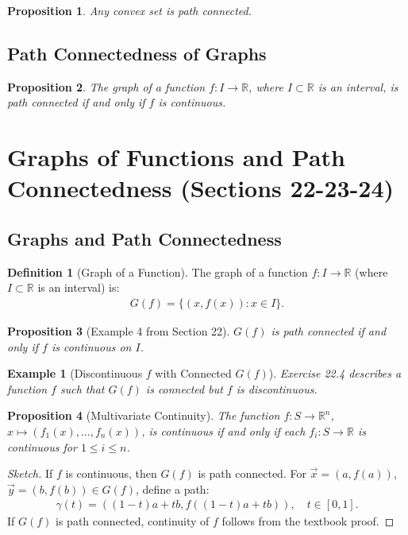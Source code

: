 \documentclass[9pt]{article}
\theoremstyle{definition}
\newtheorem{definition}{Definition}
\theoremstyle{plain}
\newtheorem{proposition}{Proposition}
\newtheorem{example}{Example}
\begin{document}
\begin{proposition}
Any convex set is path connected.
\end{proposition}

\subsection*{Path Connectedness of Graphs}
\begin{proposition}
The graph of a function $ f : I \to \mathbb{R} $, where $ I \subset \mathbb{R} $ is an interval, is path connected if and only if $ f $ is continuous.
\end{proposition}
\section*{Graphs of Functions and Path Connectedness (Sections 22-23-24)}

\subsection*{Graphs and Path Connectedness}
\begin{definition}[Graph of a Function]
The graph of a function $ f : I \to \mathbb{R} $ (where $ I \subset \mathbb{R} $ is an interval) is:
\begin{align}
G(f) = \{(x, f(x)) : x \in I\}.
\end{align}
\end{definition}

\begin{proposition}[Example 4 from Section 22]
$ G(f) $ is path connected if and only if $ f $ is continuous on $ I $.
\end{proposition}

\begin{example}[Discontinuous $ f $ with Connected $ G(f) $]
Exercise 22.4 describes a function $ f $ such that $ G(f) $ is connected but $ f $ is discontinuous.
\end{example}

\begin{proposition}[Multivariate Continuity]
The function $ f : S \to \mathbb{R}^n $, $ x \mapsto (f_1(x), \ldots, f_n(x)) $, is continuous if and only if each $ f_i : S \to \mathbb{R} $ is continuous for $ 1 \leq i \leq n $.
\end{proposition}

\begin{proof}[Sketch]
If $ f $ is continuous, then $ G(f) $ is path connected. For $ \vec{x} = (a, f(a)) $, $ \vec{y} = (b, f(b)) \in G(f) $, define a path:
\begin{align}
\gamma(t) = ((1-t)a + tb, f((1-t)a + tb)), \quad t \in [0, 1].
\end{align}
If $ G(f) $ is path connected, continuity of $ f $ follows from the textbook proof.
\end{proof}
\end{document}
